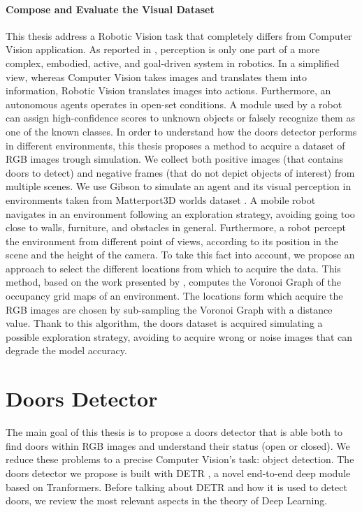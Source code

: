\paragraph{Compose and Evaluate the Visual Dataset}
This thesis address a Robotic Vision task that completely differs from Computer Vision application. As reported in \cite{surveydeeplimits}, perception is only one part of a more complex, embodied, active, and goal-driven system in robotics.
In a simplified view, whereas Computer Vision takes images and translates them into information, Robotic Vision translates images into actions. Furthermore, an autonomous agents operates in open-set conditions. A module used by a robot can assign high-confidence scores to unknown objects or falsely recognize them as one of the known classes. In order to understand how the doors detector performs in different environments, this thesis proposes a method to acquire a dataset of RGB images trough simulation. We collect both positive images (that contains doors to detect) and negative frames (that do not depict objects of interest) from multiple scenes. We use Gibson \cite{gibson} to simulate an agent and its visual perception in environments taken from Matterport3D worlds dataset \cite{matterport}. A mobile robot navigates in an environment following an exploration strategy, avoiding going too close to walls, furniture, and obstacles in general. Furthermore, a robot percept the environment from different point of views, according to its position in the scene and the height of the camera. To take this fact into account, we propose an approach to select the different locations from which to acquire the data. This method, based on the work presented by \citeauthor{repeatabilityslamarxiv} \cite{repeatabilityslamarxiv, repeatabilityslam}, computes the Voronoi Graph of the occupancy grid maps of an environment. The locations form which acquire the RGB images are chosen by sub-sampling the Voronoi Graph with a distance value. Thank to this algorithm, the doors dataset is acquired simulating a possible exploration strategy, avoiding to acquire wrong or noise images that can degrade the model accuracy.


\section{Doors Detector}

The main goal of this thesis is to propose a doors detector that is able both to find doors within RGB images and understand their status (open or closed). We reduce these problems to a precise Computer Vision's task: object detection. The doors detector we propose is built with DETR \cite{detr}, a novel end-to-end deep module based on Tranformers. Before talking about DETR and how it is used to detect doors, we review the most relevant aspects in the theory of Deep Learning.

